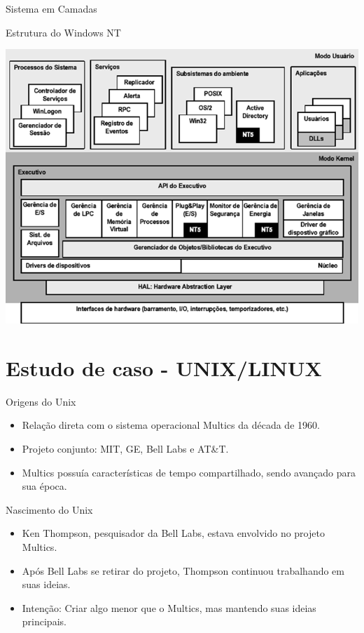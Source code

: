 \documentclass{beamer}
\begin{document}
\begin{frame}{Sistema em Camadas}
\begin{frame}{Estrutura do Windows NT}
    \begin{center}
        \includegraphics[width=0.6\linewidth]{assets/aula-tads-sope/SO-win-nt.png} %
    \end{center}
\end{frame}


\section{Estudo de caso - UNIX/LINUX}
\begin{frame}{Origens do Unix}
    \begin{itemize}
        \item Relação direta com o sistema operacional Multics da década de 1960.
        \item Projeto conjunto: MIT, GE, Bell Labs e AT\&T.
        \item Multics possuía características de tempo compartilhado, sendo avançado para sua época.
    \end{itemize}
\end{frame}

\begin{frame}{Nascimento do Unix}
    \begin{itemize}
        \item Ken Thompson, pesquisador da Bell Labs, estava envolvido no projeto Multics.
        \item Após Bell Labs se retirar do projeto, Thompson continuou trabalhando em suas ideias.
        \item Intenção: Criar algo menor que o Multics, mas mantendo suas ideias principais.
    \end{itemize}
\end{frame}


\end{frame}
\end{document}
